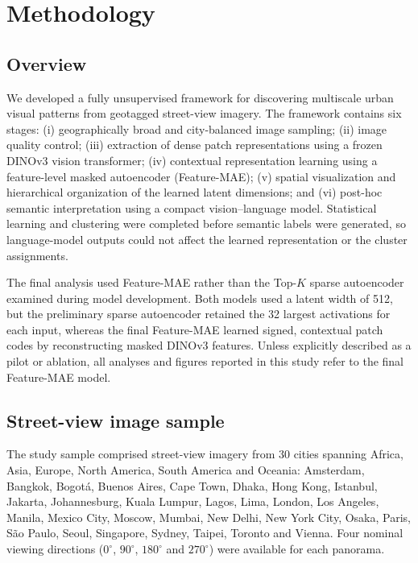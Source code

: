 % 

\section{Methodology}
\label{sec:methodology}

\subsection{Overview}
\label{sec:method_overview}

We developed a fully unsupervised framework for discovering multiscale urban
visual patterns from geotagged street-view imagery. The framework contains six
stages: (i) geographically broad and city-balanced image sampling; (ii) image
quality control; (iii) extraction of dense patch representations using a frozen
DINOv3 vision transformer; (iv) contextual representation learning using a
feature-level masked autoencoder (Feature-MAE); (v) spatial visualization and
hierarchical organization of the learned latent dimensions; and (vi) post-hoc
semantic interpretation using a compact vision--language model. Statistical
learning and clustering were completed before semantic labels were generated,
so language-model outputs could not affect the learned representation or the
cluster assignments.

The final analysis used Feature-MAE rather than the Top-$K$ sparse autoencoder
examined during model development. Both models used a latent width of 512, but
the preliminary sparse autoencoder retained the 32 largest activations for each
input, whereas the final Feature-MAE learned signed, contextual patch codes by
reconstructing masked DINOv3 features. Unless explicitly described as a pilot
or ablation, all analyses and figures reported in this study refer to the final
Feature-MAE model.

\subsection{Street-view image sample}
\label{sec:streetview_sample}

The study sample comprised street-view imagery from 30 cities spanning Africa,
Asia, Europe, North America, South America and Oceania: Amsterdam, Bangkok,
Bogot\'a, Buenos Aires, Cape Town, Dhaka, Hong Kong, Istanbul, Jakarta,
Johannesburg, Kuala Lumpur, Lagos, Lima, London, Los Angeles, Manila, Mexico
City, Moscow, Mumbai, New Delhi, New York City, Osaka, Paris, S\~ao Paulo,
Seoul, Singapore, Sydney, Taipei, Toronto and Vienna. Four nominal viewing
directions ($0^{\circ}$, $90^{\circ}$, $180^{\circ}$ and $270^{\circ}$) were
available for each panorama.

